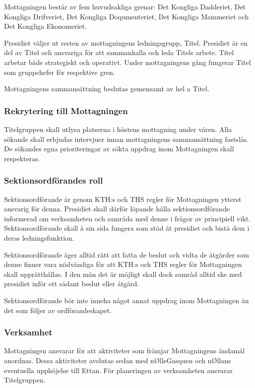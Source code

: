 \documentclass{dgovdoc}
\begin{document}
Mottagningen består av fem huvudsakliga grenar: Det Kongliga Dadderiet, Det Kongliga Drifveriet, Det Kongliga Doqumenteriet, Det Kongliga Mammeriet och Det Kongliga Ekonomeriet.


Presidiet väljer ut resten av mottagningens ledningsgrupp, Titel. Presidiet är en del av Titel och 
ansvariga för att sammankalla och leda Titels arbete.
Titel arbetar både strategiskt och operativt. Under mottagningens gång fungerar Titel som gruppchefer för respektive gren.


Mottagningens sammansättning beslutas gemensamt av hel
a Titel.

\subsubsection{Rekrytering till Mottagningen}

Titelgruppen skall utlysa platserna i höstens mottagning under våren. Alla
sökande skall erbjudas intervjuer innan mottagningens sammansättning fastslås.
De sökandes egna prioriteringar av sökta uppdrag inom Mottagningen skall
respekteras.

\subsubsection{Sektionsordförandes roll}

Sektionsordförande är genom KTH:s och THS regler för Mottagningen ytterst
ansvarig för denna. Presidiet skall därför löpande hålla sektionsordförande
informerad om verksamheten och samråda med denne i frågor av principiell vikt.
Sektionsordförande skall å sin sida fungera som stöd åt presidiet och bistå dem
i deras ledningsfunktion.

Sektionsordförande äger alltid rätt att fatta de beslut och vidta de åtgärder
som denne finner vara nödvändiga för att KTH:s och THS regler för Mottagningen
skall upprätthållas. I den mån det är möjligt skall dock samråd alltid ske med
presidiet inför ett sådant beslut eller åtgärd.

Sektionsordförande bör inte inneha något annat uppdrag inom Mottagningen än det
som följer av ordförandeskapet.

\subsubsection{Verksamhet}

Mottagningen ansvarar för att aktiviteter som främjar Mottagningens ändamål
anordnas. Dessa aktiviteter avslutas sedan med nØlleGasquen och nØllans
eventuella upphöjelse till Ettan. För planeringen av verksamheten ansvarar
Titelgruppen.
\end{document}

